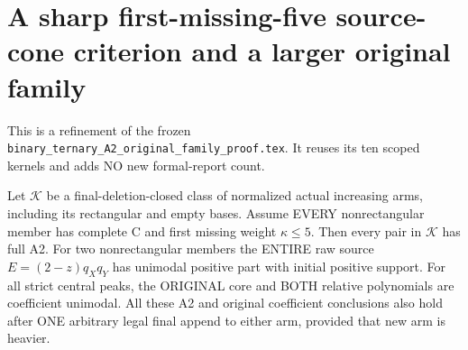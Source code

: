\section{A sharp first-missing-five source-cone criterion and a larger original family}
This is a refinement of the frozen
\texttt{binary\_ternary\_A2\_original\_family\_proof.tex}.
It reuses its ten scoped kernels and adds NO new formal-report count.

\begin{theorem}
Let $\mathcal K$ be a final-deletion-closed class of normalized actual
increasing arms, including its rectangular and empty bases. Assume
EVERY nonrectangular member has complete C and first missing weight
$\kappa\le5$. Then every pair in $\mathcal K$ has full A2.
For two nonrectangular members the ENTIRE raw source
$E=(2-z)q_Xq_Y$ has unimodal positive part with initial positive support.
For all strict central peaks, the ORIGINAL core and BOTH relative
polynomials are coefficient unimodal. All these A2 and original
coefficient conclusions also hold after ONE arbitrary legal final
append to either arm, provided that new arm is heavier.
\end{theorem}
